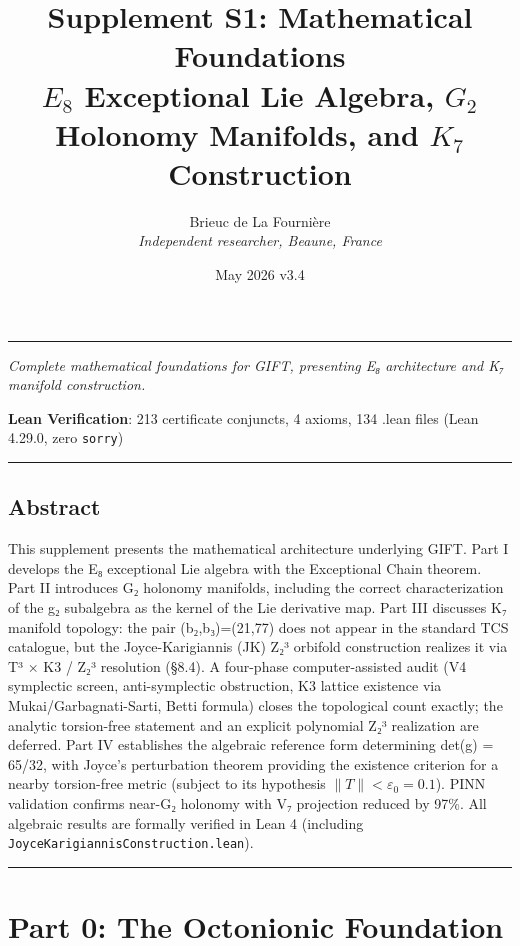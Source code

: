 \documentclass[11pt,a4paper]{article}
\title{%
\LARGE\textbf{Supplement S1: Mathematical Foundations}\\[0.3em]
\large $E_8$ Exceptional Lie Algebra, $G_2$ Holonomy Manifolds, and $K_7$ Construction%
}
\author{Brieuc de La Fourni\`ere \\ \textit{Independent researcher, Beaune, France}}
\date{May 2026 \quad\textbar\quad v3.4}
\begin{document}
\maketitle
\noindent\rule{\textwidth}{0.2pt}
\thispagestyle{fancy}

\tableofcontents
\newpage


\emph{Complete mathematical foundations for GIFT, presenting E₈ architecture and K₇ manifold construction.}

\textbf{Lean Verification}: 213 certificate conjuncts, 4 axioms, 134 .lean files (Lean 4.29.0, zero \texttt{sorry})

\begin{center}\rule{0.5\linewidth}{0.5pt}\end{center}

\subsection{Abstract}\label{abstract}

This supplement presents the mathematical architecture underlying GIFT. Part I develops the E₈ exceptional Lie algebra with the Exceptional Chain theorem. Part II introduces G₂ holonomy manifolds, including the correct characterization of the g₂ subalgebra as the kernel of the Lie derivative map. Part III discusses K₇ manifold topology: the pair (b₂,b₃)=(21,77) does not appear in the standard TCS catalogue, but the Joyce-Karigiannis (JK) Z₂³ orbifold construction realizes it via T³ × K3 / Z₂³ resolution (§8.4). A four-phase computer-assisted audit (V4 symplectic screen, anti-symplectic obstruction, K3 lattice existence via Mukai/Garbagnati-Sarti, Betti formula) closes the topological count exactly; the analytic torsion-free statement and an explicit polynomial Z₂³ realization are deferred. Part IV establishes the algebraic reference form determining det(g) = 65/32, with Joyce's perturbation theorem providing the existence criterion for a nearby torsion-free metric (subject to its hypothesis $\|T\| < \varepsilon_0 = 0.1$). PINN validation confirms near-G₂ holonomy with V₇ projection reduced by 97\%. All algebraic results are formally verified in Lean 4 (including \texttt{JoyceKarigiannisConstruction.lean}).

\begin{center}\rule{0.5\linewidth}{0.5pt}\end{center}

\section{Part 0: The Octonionic Foundation}\label{part-0-the-octonionic-foundation}
\end{document}
